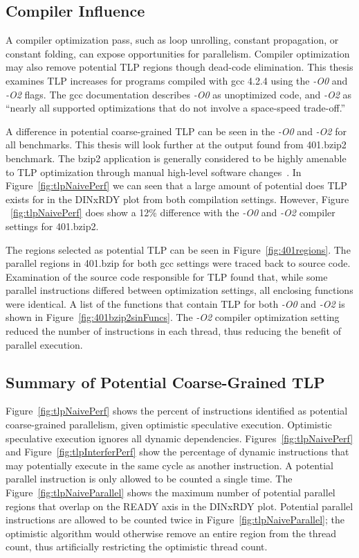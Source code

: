 {\subsection {Compiler Influence}

A compiler optimization pass, such as loop unrolling, constant propagation, or constant folding, can expose opportunities for parallelism. Compiler optimization may also remove potential TLP regions though dead-code elimination.  This thesis examines TLP increases for programs compiled with gcc 4.2.4 using the \textit{-O0} and \textit{-O2} flags.  The gcc documentation describes \textit{-O0} as unoptimized code, and \textit{-O2} as ``nearly all supported optimizations that do not involve a space-speed trade-off.''

A difference in potential coarse-grained TLP can be seen in the \textit{-O0} and \textit{-O2} for all benchmarks.  This thesis will look further at the output found from 401.bzip2 benchmark.  The bzip2 application is generally considered to be highly amenable to TLP optimization through manual high-level software changes~\cite{gilchrist:04:pdcs}.  In Figure~\ref{fig:tlpNaivePerf} we can seen that a large amount of potential does TLP exists for in the DINxRDY plot from both compilation settings.  However, Figure ~\ref{fig:tlpNaivePerf} does show a 12\% difference with the \textit{-O0} and \textit{-O2} compiler settings for 401.bzip2.

The regions selected as potential TLP can be seen in Figure~\ref{fig:401regions}.  The parallel regions in 401.bzip for both gcc settings were traced back to source code.  Examination of the source code responsible for TLP found that, while some parallel instructions differed between optimization settings, all enclosing functions were identical.  A list of the functions that contain TLP for both \textit{-O0} and \textit{-O2} is shown in Figure~\ref{fig:401bzip2sinFuncs}.  The \textit{-O2} compiler optimization setting reduced the number of instructions in each thread, thus reducing the benefit of parallel execution.

\subsection{Summary of Potential Coarse-Grained TLP}

Figure~\ref{fig:tlpNaivePerf} shows the percent of instructions identified as potential coarse-grained parallelism, given optimistic speculative execution. Optimistic speculative execution ignores all dynamic dependencies. Figures~\ref{fig:tlpNaivePerf} and Figure~\ref{fig:tlpInterferPerf} show the percentage of dynamic instructions that may potentially execute in the same cycle as another instruction.  A potential parallel instruction is only allowed to be counted a single time. The Figure~\ref{fig:tlpNaiveParallel} shows the maximum number of potential parallel regions that overlap on the READY axis in the DINxRDY plot. Potential parallel instructions are allowed to be counted twice in Figure~\ref{fig:tlpNaiveParallel}; the optimistic algorithm would otherwise remove an entire region from the thread count, thus artificially restricting the optimistic thread count.

}
